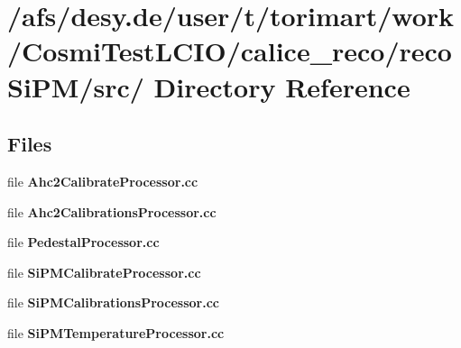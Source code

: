 \section{/afs/desy.de/user/t/torimart/work/CosmiTestLCIO/calice\_\-reco/recoSiPM/src/ Directory Reference}
\label{dir_1f1ceb4cb990831dc6e091a4a09bb7bd}
\subsection*{Files}
\begin{DoxyCompactItemize}
\item 
file {\bfseries Ahc2CalibrateProcessor.cc}
\item 
file {\bfseries Ahc2CalibrationsProcessor.cc}
\item 
file {\bfseries PedestalProcessor.cc}
\item 
file {\bfseries SiPMCalibrateProcessor.cc}
\item 
file {\bfseries SiPMCalibrationsProcessor.cc}
\item 
file {\bfseries SiPMTemperatureProcessor.cc}
\end{DoxyCompactItemize}
